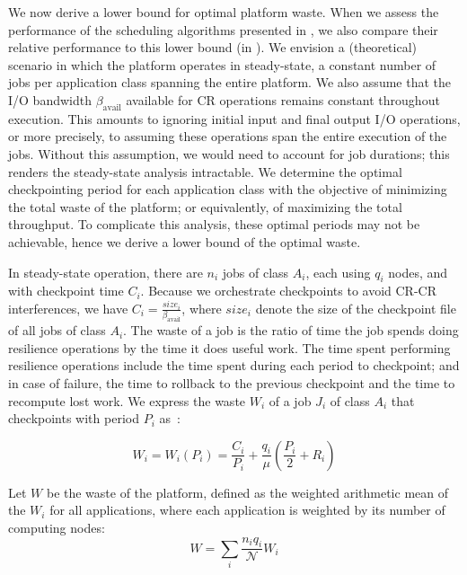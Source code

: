 \documentclass[conference,nofonttune]{IEEEtran}
\newcommand{\bandavail}{\beta_{\text{avail}}}
\newcommand{\nbnodesplat}{{\mathcal N}}
\newcommand{\app}[1]{A_{#1}}
\newcommand{\nbapp}[1]{n_{#1}}
\newcommand{\nbnodes}[1]{q_{#1}}
\newcommand{\period}[1]{P_{#1}}
\newcommand{\ckpt}[1]{C_{#1}}
\newcommand{\reco}[1]{R_{#1}}
\newcommand{\size}[1]{\mathit{size}_{#1}}
\newcommand{\wasteapp}[1]{W_{#1}}
\newcommand{\mtbfplat}{\mu}
\newcommand{\wasteplat}{W}
\newcommand{\wastefct}[2]{W_{#1}(#2)}
\begin{document}
We now derive a lower bound for optimal platform waste.  When we assess the
performance of the scheduling algorithms presented in , we
also compare their relative performance to this lower bound (in
).
We envision a (theoretical) scenario in which the platform operates in
steady-state, a constant number of jobs per application class spanning the
entire platform.  We also assume that the I/O bandwidth $\bandavail$ available
for CR operations remains constant throughout execution. This amounts to
ignoring initial input and final output I/O operations, or more precisely, to
assuming these operations span the entire execution of the jobs.  Without this
assumption, we would need to account for job durations; this renders the
steady-state analysis intractable.  We determine the optimal
checkpointing period for each application class with the objective of minimizing
the total waste of the platform; or equivalently, of maximizing the total
throughput. To complicate this analysis, these optimal periods
may not be achievable, hence we derive a lower bound of the optimal waste.

In steady-state operation, there are $\nbapp{i}$ jobs of class $\app{i}$, each
using $\nbnodes{i}$ nodes, and with checkpoint time $\ckpt{i}$. Because we
orchestrate checkpoints to avoid CR-CR interferences, we have $\ckpt{i} =
\frac{\size{i}}{\bandavail}$, where $\size{i}$ denote the size of the
checkpoint file of all jobs of class $\app{i}$.  The waste of a job is the
ratio of time the job spends doing resilience operations by the time it does
useful work. The time spent performing resilience operations include the time spent
during each period to checkpoint; and in case of failure, the time to rollback
to the previous checkpoint and the time to recompute lost work.
We express the waste $\wasteapp{i}$ of a job $J_{i}$ of class $\app{i}$
that checkpoints with period $\period{i}$ as~\cite{springer-monograph}:

\begin{equation}
\wasteapp{i} = \wastefct{i}{\period{i}} = \frac{\ckpt{i}}{\period{i}} +
\frac{\nbnodes{i}}{\mtbfplat}(\frac{\period{i}}{2} + \reco{i})
\label{eq.wasteAi}
\end{equation}

Let $\wasteplat$ be the waste of the platform, defined as the
weighted arithmetic mean of the $\wasteapp{i}$ for all applications,
where each application is weighted by its number of computing nodes:
\begin{equation}
\wasteplat = \sum_i \frac{\nbapp{i} \nbnodes{i}}{\nbnodesplat} \wasteapp{i}
\label{eq.waste}
\end{equation}
\end{document}
